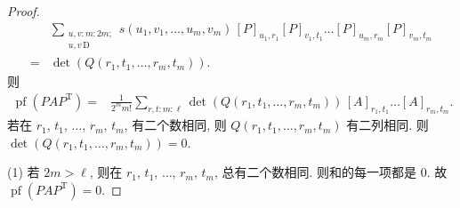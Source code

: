 \documentclass[../libro]{subfiles}
\begin{document}
\begin{proof}
\begin{align*}
             &
        \sum_{\substack{
        u, v \text{:}\, m \text{:}\, 2m; \\
                u, v \,\text{D}
            }}
        s(u_1, v_1, \dots, u_m, v_m)
        \,
        [P]_{u_1,r_1} [P]_{v_1,t_1} \dots [P]_{u_m,r_m} [P]_{v_m,t_m}
        \\
        = {} &
        \det {(Q(r_1, t_1, \dots, r_m, t_m))}.
    \end{align*}
    则
    \begin{align*}
        \operatorname{pf} {(P A P^{\mathrm{T}})}
        = {} &
        \frac{1}{2^m m!}
        \sum_{r, t \text{:}\, m \text{:}\, \ell}
        \det {(Q(r_1, t_1, \dots, r_m, t_m))}
        \,
        [A]_{r_1,t_1} \dots [A]_{r_m,t_m}.
    \end{align*}
    若在 \(r_1\), \(t_1\), \(\dots\), \(r_m\), \(t_m\),
    有二个数相同,
    则 \(Q(r_1, t_1, \dots, r_m, t_m)\) 有二列相同.
    则 \(\det {(Q(r_1, t_1, \dots, r_m, t_m))} = 0\).

    (1)
    若 \(2m > \ell\),
    则在 \(r_1\), \(t_1\), \(\dots\), \(r_m\), \(t_m\),
    总有二个数相同.
    则和的每一项都是 \(0\).
    故 \(\operatorname{pf} {(P A P^{\mathrm{T}})} = 0\).


\end{proof}
\end{document}
